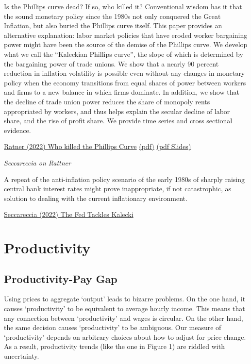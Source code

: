 \documentclass[
]{book}
\begin{document}
Is the Phillips curve dead? If so, who killed it? Conventional wisdom has it that the sound monetary policy since the 1980s not only conquered the Great Inflation, but also buried the Phillips curve itself. This paper provides an alternative explanation: labor market policies that have eroded worker bargaining power might have been the source of the demise of the Phillips curve. We develop what we call the ``Kaleckian Phillips curve'', the slope of which is determined by the bargaining power of trade unions. We show that a nearly 90 percent reduction in inflation volatility is possible even without any changes in monetary policy when the economy transitions from equal shares of power between workers and firms to a new balance in which firms dominate. In addition, we show that the decline of trade union power reduces the share of monopoly rents appropriated by workers, and thus helps explain the secular decline of labor share, and the rise of profit share. We provide time series and cross sectional evidence.

\href{https://papers.ssrn.com/sol3/papers.cfm?abstract_id=4118173}{Ratner (2022) Who killed the Phillips Curve}
\href{pdf/Ratner_2019_Who_killed_the_Phillips_Curve.pdf}{(pdf)}
\href{pdf/Ratner_2019_Who_killed_the_Phillips_Curve_Slides.pdf}{(pdf Slides)}

\emph{Seccareccia on Rattner}

A repeat of the anti-inflation policy scenario of the early 1980s of sharply raising central bank interest rates might prove inappropriate, if not catastrophic, as solution to dealing with the current inflationary environment.

\href{https://www.ineteconomics.org/perspectives/blog/the-fed-tackles-kalecki}{Seccareccia (2022) The Fed Tackles Kalecki}

\hypertarget{productivity}{%
\chapter{Productivity}\label{productivity}}

\hypertarget{productivity-pay-gap}{%
\section{Productivity-Pay Gap}\label{productivity-pay-gap}}

Using prices to aggregate `output' leads to bizarre problems. On the one hand, it causes `productivity' to be equivalent to average hourly income. This means that any connection between `productivity' and wages is circular. On the other hand, the same decision causes `productivity' to be ambiguous. Our measure of `productivity' depends on arbitrary choices about how to adjust for price change. As a result, productivity trends (like the one in Figure 1) are riddled with uncertainty.
\end{document}
